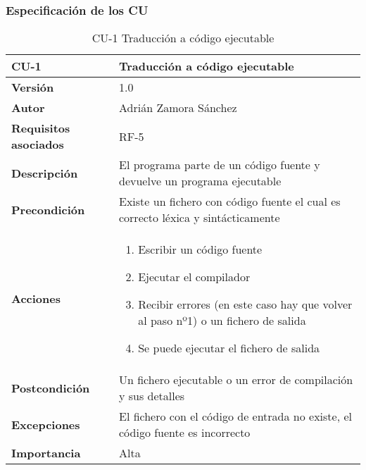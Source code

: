 \subsubsection{Especificación de los CU}
\begin{table}[p]
	\centering
	\begin{tabularx}{\linewidth}{ p{} p{} }
		\toprule
		\textbf{CU-1}    & \textbf{Traducción a código ejecutable}\\
		\toprule
		\textbf{Versión}              & 1.0    \\
		\textbf{Autor}                & Adrián Zamora Sánchez \\
		\textbf{Requisitos asociados} & RF-5\\
		\textbf{Descripción}          & El programa parte de un código fuente y devuelve un programa ejecutable \\
		\textbf{Precondición}         & Existe un fichero con código fuente el cual es correcto léxica y sintácticamente \\
		\textbf{Acciones}             &
		\begin{enumerate}
			\def\labelenumi{\arabic{enumi}.}
			\tightlist
			\item Escribir un código fuente
			\item Ejecutar el compilador
			\item Recibir errores (en este caso hay que volver al paso nº1) o un fichero de salida 
			\item Se puede ejecutar el fichero de salida
		\end{enumerate}\\
		\textbf{Postcondición}        & Un fichero ejecutable o un error de compilación y sus detalles \\
		\textbf{Excepciones}          & El fichero con el código de entrada no existe, el código fuente es incorrecto \\
		\textbf{Importancia}          & Alta \\ 
		\bottomrule
	\end{tabularx}
	\caption{CU-1 Traducción a código ejecutable}
\end{table}


